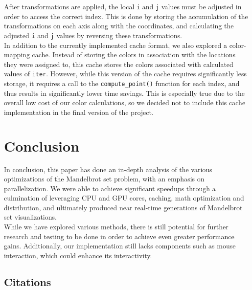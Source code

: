 \documentclass{article}
\begin{document}
After transformations are applied, the local \verb|i| and \verb|j| values must be adjusted in order to access the correct index.
This is done by storing the accumulation of the transformations on each axis along with the coordinates, and calculating the adjusted \verb|i| and \verb|j| values by reversing these transformations.\\

In addition to the currently implemented cache format, we also explored a color-mapping cache.
Instead of storing the colors in association with the locations they were assigned to, this cache stores the colors associated with calculated values of \verb|iter|.
However, while this version of the cache requires significantly less storage, it requires a call to the \verb|compute_point()| function for each index, and thus results in significantly lower time savings.
This is especially true due to the overall low cost of our color calculations, so we decided not to include this cache implementation in the final version of the project.

\section{Conclusion}

In conclusion, this paper has done an in-depth analysis of the various optimizations of the Mandelbrot set problem, with an emphasis on parallelization.
We were able to achieve significant speedups through a culmination of leveraging CPU and GPU cores, caching, math optimization and distribution, and ultimately produced near real-time generations of Mandelbrot set visualizations.\\

While we have explored various methods, there is still potential for further research and testing to be done in order to achieve even greater performance gains.
Additionally, our implementation still lacks components such as mouse interaction, which could enhance its interactivity.

\pagebreak

\begin{center}

\section*{Citations}

\end{center}
\end{document}
